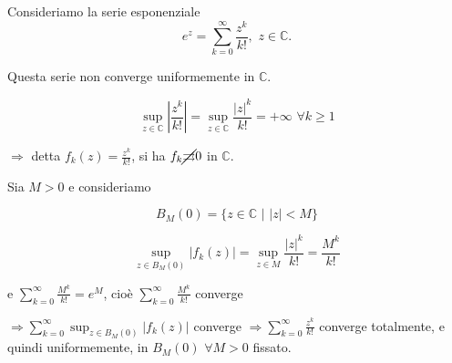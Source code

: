 \begin{exbar}
\begin{example}
	Consideriamo la serie esponenziale
	\begin{equation*}
		e^z= \sum_{k=0}^{\infty} \frac{z^k}{k!}, \,\,z \in \mathbb{C}.    
	\end{equation*}
	
	Questa serie non converge uniformemente in $\mathbb{C}$.
	
	$$\sup_{z\in\mathbb{C}} \left|\frac{z^k}{k!}\right|=\sup_{z\in\mathbb{C}}\frac{|z|^k}{k!}=+\infty\,\, \forall k \geq 1$$
	
	$\Rightarrow$ detta $f_k(z)=\frac{z^k}{k!}$, si ha $f_k \cancel{\rightrightarrows} 0$ in $\mathbb{C}$.
	
	Sia $M >0 $ e consideriamo 
	
	$$B_M(0)=\{z \in \mathbb{C}\,\, | \,\, |z|< M\}$$
	
	$$\sup_{z \in B_M(0)}|f_k(z)|=\sup_{z \in M}\frac{|z|^k}{k!}=\frac{M^k}{k!}$$ 
	
	e $\sum_{k=0}^{\infty} \frac{M^k}{k!}=e^M$, cioè $\sum_{k=0}^{\infty}\frac{M^k}{k!}$ converge
	
	$\Rightarrow \sum_{k=0}^{\infty}\sup_{z \in B_M(0)}|f_k(z)|$ converge $\Rightarrow \sum_{k=0}^{\infty}\frac{z^k}{k!}$ converge totalmente, e quindi uniformemente, in $B_M(0) \,\, \forall M >0$ fissato.
	
\end{example}
\end{exbar}


